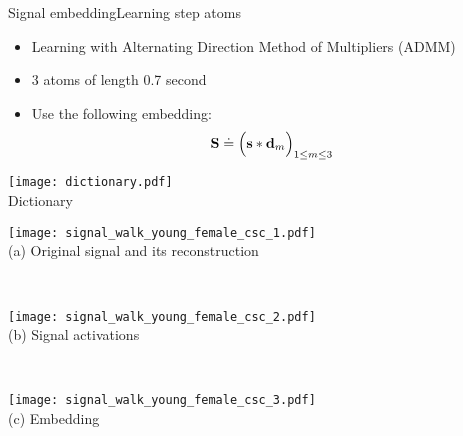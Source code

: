 \begin{frame}{Signal embedding}{Learning step atoms}

\renewcommand{\ratio}{0.9}
\centering
\begin{minipage}[t]{0.45\linewidth}
    \vspace{0pt}
    \begin{itemize}
        \item Learning with Alternating Direction Method of Multipliers (ADMM) \cite{bristow2013fast}
            \item 3 atoms of length 0.7 second

        \pause[3]
        \item Use the following embedding:
        \begin{equation*}\label{eq: convolutional embedding}
        \mathbf{S} \doteq \Big( \mathbf{s} * \mathbf{d}_m\Big)_{1 \le m \le 3 }
        \end{equation*}
    \end{itemize}

    \centering
    \texttt{[image: dictionary.pdf]}\\
    \smallskip
    {\small Dictionary}
\end{minipage}
\begin{minipage}[t]{0.54\linewidth}
    \vspace{0pt}
    \renewcommand{\ratio}{0.8}
        \begin{minipage}{\linewidth}
            \centering
            \texttt{[image: signal\_walk\_young\_female\_csc\_1.pdf]}\\
            {\small (a)\; Original signal and its reconstruction}
        \end{minipage}\\
        \begin{minipage}{\linewidth}
            \centering
            \texttt{[image: signal\_walk\_young\_female\_csc\_2.pdf]}\\
            {\small (b)\; Signal activations}
        \end{minipage}\\
        \begin{minipage}{\linewidth}
            \centering
            \texttt{[image: signal\_walk\_young\_female\_csc\_3.pdf]}\\
            {\small (c)\; Embedding}
        \end{minipage}
\end{minipage}

\end{frame}


